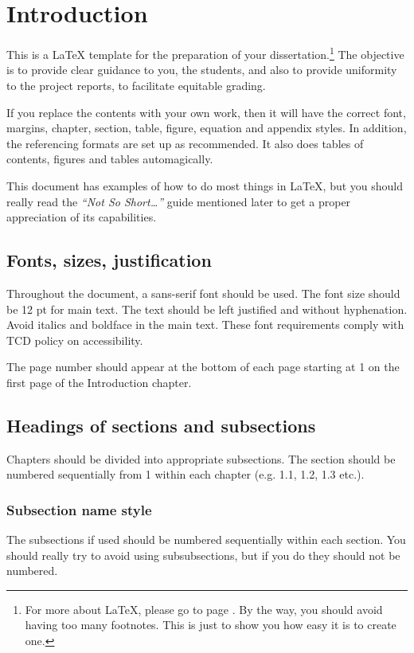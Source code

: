 \chapter{Introduction}
This is a \LaTeX{} template for the preparation of your dissertation.\footnote{For more about \LaTeX{}, please go to page \pageref{latexchapter}.  By the way, you should avoid having too many footnotes. This is just to show you how easy it is to create one.} The objective is to provide clear guidance to you, the students, and also to provide uniformity to the project reports, to facilitate equitable grading.

If you replace the contents with your own work, then it will have the correct font, margins, chapter, section, table, figure, equation and appendix styles. In addition, the referencing formats are set up as recommended. It also does tables of contents, figures and tables automagically.

This document has examples of how to do most things in \LaTeX{}, but you should really read the \emph{``Not So Short\ldots''} guide mentioned later to get a proper appreciation of its capabilities.

\section{Fonts, sizes, justification}

Throughout the document, a sans-serif font should be used. The font size should be 12 pt for main text. The text should be left justified and without hyphenation. Avoid italics and boldface in the main text. These font requirements comply with TCD policy on accessibility.

The page number should appear at the bottom of each page starting at 1 on the first page of the Introduction chapter. 

\section{Headings of sections and subsections}
Chapters should be divided into appropriate subsections. The section should be numbered sequentially from 1 within each chapter (e.g. 1.1, 1.2, 1.3 etc.).

\subsection{Subsection name style}
The subsections if used should be numbered sequentially within each section. You should really try to avoid using subsubsections, but if you do they should not be numbered.

